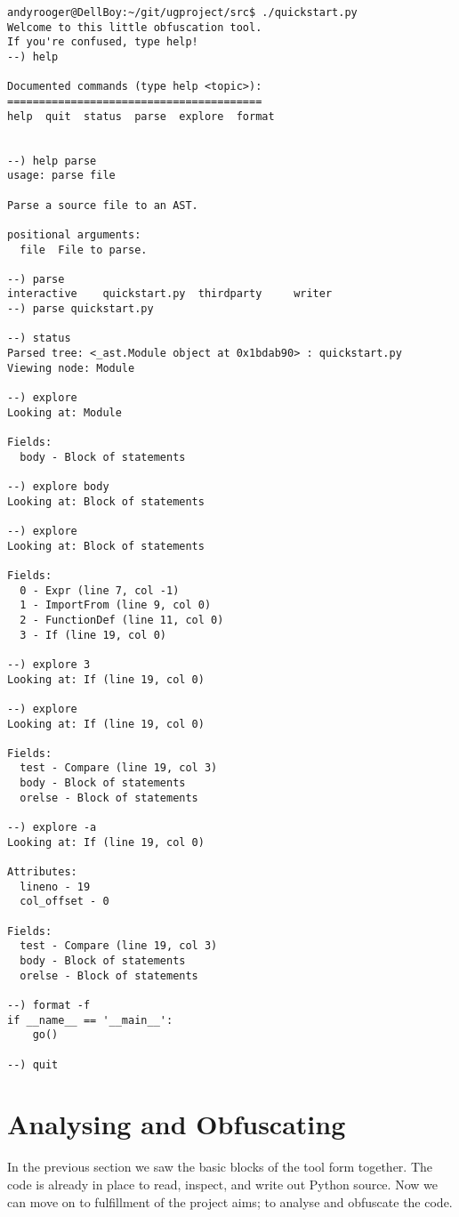 \documentclass{report}
\begin{document}
\clearpage

\begin{lstlisting}[language=obftool,basicstyle=\small]
andyrooger@DellBoy:~/git/ugproject/src$ ./quickstart.py 
Welcome to this little obfuscation tool.
If you're confused, type help!
--) help

Documented commands (type help <topic>):
========================================
help  quit  status  parse  explore  format


--) help parse
usage: parse file

Parse a source file to an AST.

positional arguments:
  file  File to parse.

--) parse 
interactive    quickstart.py  thirdparty     writer         
--) parse quickstart.py

--) status
Parsed tree: <_ast.Module object at 0x1bdab90> : quickstart.py
Viewing node: Module

--) explore
Looking at: Module

Fields:
  body - Block of statements

--) explore body
Looking at: Block of statements

--) explore
Looking at: Block of statements

Fields:
  0 - Expr (line 7, col -1)
  1 - ImportFrom (line 9, col 0)
  2 - FunctionDef (line 11, col 0)
  3 - If (line 19, col 0)

--) explore 3
Looking at: If (line 19, col 0)

--) explore
Looking at: If (line 19, col 0)

Fields:
  test - Compare (line 19, col 3)
  body - Block of statements
  orelse - Block of statements

--) explore -a
Looking at: If (line 19, col 0)

Attributes:
  lineno - 19
  col_offset - 0

Fields:
  test - Compare (line 19, col 3)
  body - Block of statements
  orelse - Block of statements

--) format -f
if __name__ == '__main__':
    go()

--) quit
\end{lstlisting}

\section{Analysing and Obfuscating}

In the previous section we saw the basic blocks of the tool form together. The code
is already in place to read, inspect, and write out Python source. Now we can move
on to fulfillment of the project aims; to analyse and obfuscate the code.
\end{document}

